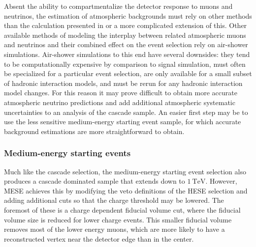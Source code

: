 Absent the ability to compartmentalize the detector response to muons and neutrinos, the estimation of atmospheric backgrounds must rely on other methods than the calculation presented in  or a more complicated extension of this.
Other available methods of modeling the interplay between related atmospheric muons and neutrinos and their combined effect on the event selection rely on air-shower simulations.
Air-shower simulations to this end have several downsides: they tend to be computationally expensive by comparison to signal simulation, must often be specialized for a particular event selection, are only available for a small subset of hadronic interaction models, and must be rerun for any hadronic interaction model changes.
For this reason it may prove difficult to obtain more accurate atmospheric neutrino predictions and add additional atmospheric systematic uncertainties to an analysis of the cascade sample.
An easier first step may be to use the less sensitive medium-energy starting event sample, for which accurate background estimations are more straightforward to obtain.

\subsubsection{Medium-energy starting events}
Much like the cascade selection, the medium-energy starting event selection also produces a cascade dominated sample that extends down to $\SI{1}\TeV$.
However, MESE achieves this by modifying the veto definitions of the HESE selection and adding additional cuts so that the charge threshold may be lowered.
The foremost of these is a charge dependent fiducial volume cut, where the fiducial volume size is reduced for lower charge events.
This smaller fiducial volume removes most of the lower energy muons, which are more likely to have a reconstructed vertex near the detector edge than in the center.

